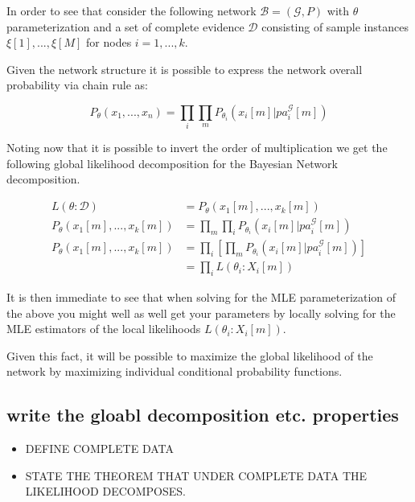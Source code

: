 \documentclass[11pt]{article}
\begin{document}
\begin{article}
In order to see that consider the following network \(\mathscr{B} =
  (\mathscr{G}, P)\) with \(\theta\) parameterization and a set of complete
evidence \(\mathscr{D}\) consisting of sample instances \(\xi[1], ...,
  \xi[M]\) for nodes \(i = 1, ..., k\).

Given the network structure it is possible to express the network
overall probability via chain rule as:

\begin{equation} \label{eq:global_decomposition}
P_{\theta} (x_1, ..., x_n) = \prod_i \prod_m P_{\theta_i}(x_i[m] | pa_i^{\mathscr{G}}[m])  \nonumber
\end{equation}

Noting now that it is possible to invert the order of multiplication
we get the following global likelihood decomposition for the
Bayesian Network decomposition. 

\begin{align} \label{eq:global_decomposition}
L(\theta : \mathscr{D})       &=  P_{\theta} (x_1[m], ..., x_k[m]) \nonumber \\ 
P_{\theta} (x_1[m], ..., x_k[m]) &= \prod_m \prod_i  P_{\theta_i}(x_i[m] | pa_i^{\mathscr{G}}[m])  \nonumber \\
P_{\theta} (x_1[m], ..., x_k[m]) &= \prod_i [\prod_m  P_{\theta_i}(x_i[m] | pa_i^{\mathscr{G}}[m])]  \nonumber \\
                              &= \prod_i L(\theta_i : X_i[m])  \nonumber    
\end{align}

It is then immediate to see that when solving for the MLE
parameterization of the above you might well as well get your
parameters by locally solving for the MLE estimators of the local
likelihoods \(L(\theta_i : X_i[m])\).





Given this fact, it will be possible to maximize the global
likelihood of the network by maximizing individual conditional
probability functions.

\subsection{write the gloabl decomposition etc. properties}
\label{sec:orgf048e63}

\begin{itemize}
\item DEFINE COMPLETE DATA

\item STATE THE THEOREM THAT UNDER COMPLETE DATA THE LIKELIHOOD DECOMPOSES.


\end{itemize}
\end{article}
\end{document}

